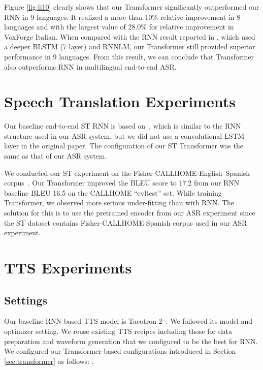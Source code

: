 Figure \ref{fig:li10} clearly shows that our Transformer significantly outperformed our RNN in 9 languages.
It realized a more than 10\% relative improvement in 8 languages and with the largest value of 28.0\% for relative improvement in VoxForge Italian.
When compared with the RNN result reported in \cite{watanabe2017language}, which used a deeper BLSTM (7 layer) and RNNLM, our Transformer still provided superior performance in 9 languages. 
From this result, we can conclude that Transformer also outperforms RNN in multilingual end-to-end ASR.

\section{Speech Translation Experiments}

Our baseline end-to-end ST RNN is based on~\cite{Weiss2017}, which is similar to the RNN structure used in our ASR system, but we did not use a convolutional LSTM layer in the original paper.
The configuration of our ST Transformer was the same as that of our ASR system.

We conducted our ST experiment on the Fisher-CALLHOME English--Spanish corpus~\cite{post2013improved}.
Our Transformer improved the BLEU score to 17.2 from our RNN baseline BLEU 16.5 on the CALLHOME ``evltest'' set. 
While training Transformer, we observed more serious under-fitting than with RNN.
The solution for this is to use the pretrained encoder from our ASR experiment since the ST dataset contains Fisher-CALLHOME Spanish corpus used in our ASR experiment.

\section{TTS Experiments}

\subsection{Settings}
Our baseline RNN-based TTS model is Tacotron 2~\cite{DBLP:conf/icassp/ShenPWSJYCZWRSA18}.
We followed its model and optimizer setting.
We reuse existing TTS recipes including those for data preparation and waveform generation that we configured to be the best for RNN.
We configured our Transformer-based configurations introduced in Section \ref{sec:transformer} as follows: . 

